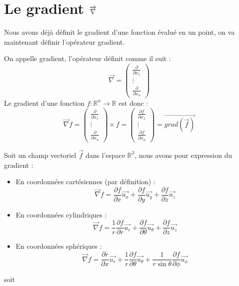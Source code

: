 \section{Le gradient $\protect\overrightarrow{\nabla}$}
Nous avons déjà définit le gradient d'une fonction évalué en un point, on va maintenant définir l'opérateur gradient.
\begin{defi}
On appelle gradient, l'opérateur définit comme il suit :
$$\overrightarrow{\nabla}=\begin{pmatrix}\frac{\partial}{\partial x_1}\\\vdots\\\frac{\partial}{\partial x_n}\end{pmatrix}$$
\newline
Le gradient d'une fonction $f:\mathbb{R}^n\to\mathbb{R}$ est donc :
$$\overrightarrow{\nabla}f=\begin{pmatrix}\frac{\partial}{\partial x_1}\\\vdots\\\frac{\partial}{\partial x_n}\end{pmatrix}\times f=\begin{pmatrix}\frac{\partial f}{\partial x_1}\\\vdots\\\frac{\partial f}{\partial x_n}\end{pmatrix}=\overrightarrow{grad(\overrightarrow{f})}$$
\end{defi}
\begin{prop}
Soit un champ vectoriel $\overrightarrow{f}$ dans l'espace $\mathbb{R}^3$, nous avons pour expression du gradient :
\begin{itemize}
    \item En coordonnées cartésiennes (par définition) : $$\overrightarrow{\nabla}f=\frac{\partial f}{\partial x}\overrightarrow{u_x}+\frac{\partial f}{\partial y}\overrightarrow{u_y}+\frac{\partial f}{\partial z}\overrightarrow{u_z}$$
    \item En coordonnées cylindriques : $$\overrightarrow{\nabla}f=\frac{1}{r}\frac{\partial f}{\partial r}\overrightarrow{u_r}+\frac{\partial f}{\partial \theta}\overrightarrow{u_\theta}+\frac{\partial f}{\partial z}\overrightarrow{u_z}$$
    \item En coordonnées sphériques : $$\overrightarrow{\nabla}f=\frac{\partial r}{\partial x}\overrightarrow{u_r}+\frac{1}{r}\frac{\partial f}{\partial \theta}\overrightarrow{u_\theta}+\frac{1}{r\sin{\theta}}\frac{\partial f}{\partial \phi}\overrightarrow{u_\phi}$$
\end{itemize}
\end{prop}
\begin{demo}
soit
\end{demo}
